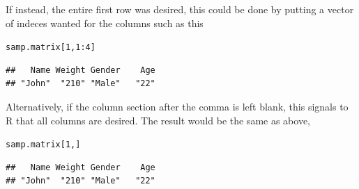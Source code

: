 \documentclass{report}\usepackage[]{graphicx}\usepackage[]{color}
\makeatletter
\newcommand{\hlnum}[1]{\textcolor[rgb]{0.686,0.059,0.569}{#1}}%
\newcommand{\hlopt}[1]{\textcolor[rgb]{0,0,0}{#1}}%
\newcommand{\hlstd}[1]{\textcolor[rgb]{0.345,0.345,0.345}{#1}}%
\newenvironment{kframe}{%
 \def\at@end@of@kframe{}%
 \ifinner\ifhmode%
  \def\at@end@of@kframe{\end{minipage}}%
  \begin{minipage}{\columnwidth}%
 \fi\fi%
 \def\FrameCommand##1{\hskip\@totalleftmargin \hskip-\fboxsep
 \colorbox{shadecolor}{##1}\hskip-\fboxsep
     \hskip-\linewidth \hskip-\@totalleftmargin \hskip\columnwidth}%
 \MakeFramed {\advance\hsize-\width
   \@totalleftmargin\z@ \linewidth\hsize
   \@setminipage}}%
 {\par\unskip\endMakeFramed%
 \at@end@of@kframe}
\newenvironment{knitrout}{}{} %
\makeatother
\begin{document}
If instead, the entire first row was desired, this could be done by putting a vector of indeces wanted for the columns such as this 

\begin{knitrout}
\color{fgcolor}\begin{kframe}
\begin{alltt}
\hlstd{samp.matrix[}\hlnum{1}\hlstd{,}\hlnum{1}\hlopt{:}\hlnum{4}\hlstd{]}
\end{alltt}
\begin{verbatim}
##   Name Weight Gender    Age 
## "John"  "210" "Male"   "22"
\end{verbatim}
\end{kframe}
\end{knitrout}

Alternatively, if the column section after the comma is left blank, this signals to \textsf{R} that all columns are desired.  The result would be the same as above, 
\begin{knitrout}
\color{fgcolor}\begin{kframe}
\begin{alltt}
\hlstd{samp.matrix[}\hlnum{1}\hlstd{,]}
\end{alltt}
\begin{verbatim}
##   Name Weight Gender    Age 
## "John"  "210" "Male"   "22"
\end{verbatim}
\end{kframe}
\end{knitrout}
\end{document}
